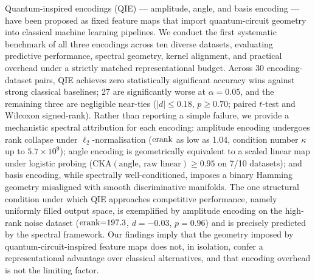 Quantum-inspired encodings (QIE) — amplitude, angle, and basis encoding —
have been proposed as fixed feature maps that import quantum-circuit geometry
into classical machine learning pipelines.
We conduct the first systematic benchmark of all three encodings across ten
diverse datasets, evaluating predictive performance, spectral geometry, kernel
alignment, and practical overhead under a strictly matched representational budget.
Across 30 encoding-dataset pairs, QIE achieves zero statistically significant
accuracy wins against strong classical baselines; 27 are significantly worse at
$\alpha{=}0.05$, and the remaining three are negligible near-ties
($|d|\leq 0.18$, $p\geq 0.70$; paired $t$-test and Wilcoxon signed-rank).
Rather than reporting a simple failure, we provide a mechanistic spectral
attribution for each encoding: amplitude encoding undergoes rank collapse under
$\ell_2$-normalisation ($\mathrm{erank}$ as low as 1.04, condition number $\kappa$
up to $5.7{\times}10^9$); angle encoding is geometrically equivalent to a
scaled linear map under logistic probing
($\mathrm{CKA}(\text{angle, raw linear})\geq 0.95$ on 7/10 datasets);
and basis encoding, while spectrally well-conditioned, imposes a binary Hamming
geometry misaligned with smooth discriminative manifolds.
The one structural condition under which QIE approaches competitive performance,
namely uniformly filled output space, is exemplified by amplitude encoding on the
high-rank noise dataset ($\mathrm{erank}{=}197.3$, $d{=}{-}0.03$, $p{=}0.96$) and is
precisely predicted by the spectral framework.
Our findings imply that the geometry imposed by quantum-circuit-inspired feature
maps does not, in isolation, confer a representational advantage over classical
alternatives, and that encoding overhead is not the limiting factor.
